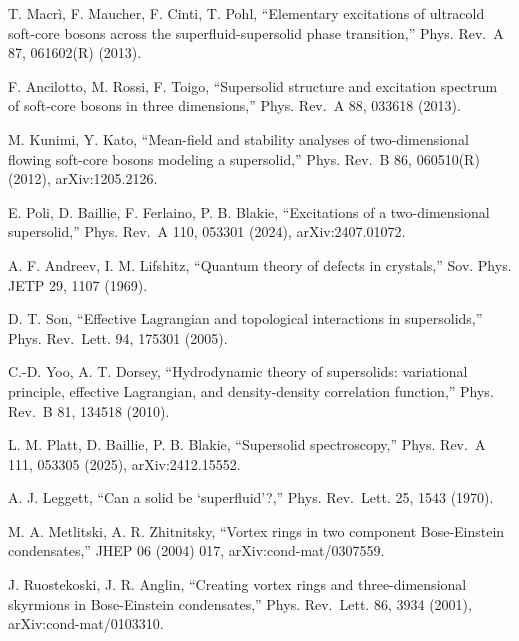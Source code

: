 \documentclass[
  11pt,
]{article}
\begin{document}
\begin{list}{}{\setlength{\leftmargin}{2.5em}\setlength{\labelwidth}{2.2em}\setlength{\labelsep}{0.3em}\setlength{\itemsep}{1pt}\setlength{\parsep}{0pt}\setlength{\topsep}{2pt}}
\item[{[35]}] T. Macrì, F. Maucher, F. Cinti, T. Pohl, ``Elementary
excitations of ultracold soft-core bosons across the
superfluid-supersolid phase transition,'' Phys. Rev.~A 87, 061602(R)
(2013).

\item[{[36]}] F. Ancilotto, M. Rossi, F. Toigo, ``Supersolid structure
and excitation spectrum of soft-core bosons in three dimensions,'' Phys.
Rev.~A 88, 033618 (2013).

\item[{[37]}] M. Kunimi, Y. Kato, ``Mean-field and stability analyses of
two-dimensional flowing soft-core bosons modeling a supersolid,'' Phys.
Rev.~B 86, 060510(R) (2012), arXiv:1205.2126.

\item[{[38]}] E. Poli, D. Baillie, F. Ferlaino, P. B. Blakie,
``Excitations of a two-dimensional supersolid,'' Phys. Rev.~A 110,
053301 (2024), arXiv:2407.01072.

\item[{[39]}] A. F. Andreev, I. M. Lifshitz, ``Quantum theory of defects
in crystals,'' Sov. Phys. JETP 29, 1107 (1969).

\item[{[40]}] D. T. Son, ``Effective Lagrangian and topological
interactions in supersolids,'' Phys. Rev.~Lett. 94, 175301 (2005).

\item[{[41]}] C.-D. Yoo, A. T. Dorsey, ``Hydrodynamic theory of
supersolids: variational principle, effective Lagrangian, and
density-density correlation function,'' Phys. Rev.~B 81, 134518 (2010).

\item[{[42]}] L. M. Platt, D. Baillie, P. B. Blakie, ``Supersolid
spectroscopy,'' Phys. Rev.~A 111, 053305 (2025), arXiv:2412.15552.

\item[{[43]}] A. J. Leggett, ``Can a solid be `superfluid'?,'' Phys.
Rev.~Lett. 25, 1543 (1970).

\item[{[44]}] M. A. Metlitski, A. R. Zhitnitsky, ``Vortex rings in two
component Bose-Einstein condensates,'' JHEP 06 (2004) 017,
arXiv:cond-mat/0307559.

\item[{[45]}] J. Ruostekoski, J. R. Anglin, ``Creating vortex rings and
three-dimensional skyrmions in Bose-Einstein condensates,'' Phys.
Rev.~Lett. 86, 3934 (2001), arXiv:cond-mat/0103310.


\end{list}
\end{document}

